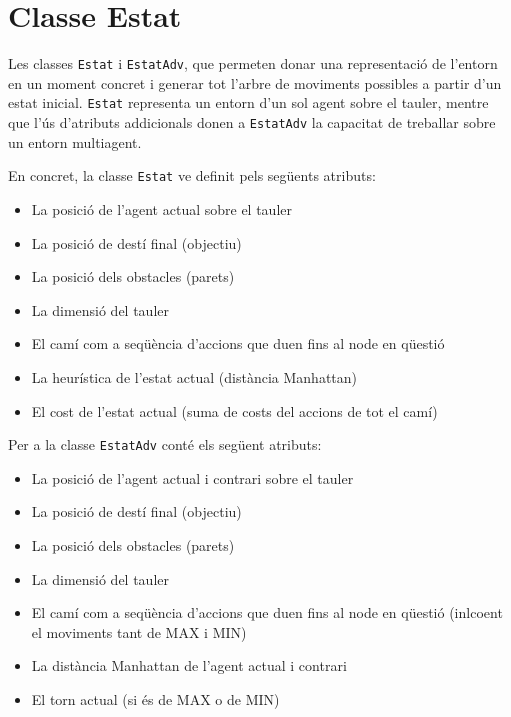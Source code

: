 \documentclass[12pt,a4paper]{report}
\begin{document}
\section{Classe Estat}
Les classes \texttt{Estat} i \texttt{EstatAdv}, que permeten donar
una representació de l'entorn en un moment concret i generar tot l'arbre de moviments possibles a partir d'un estat inicial.
\texttt{Estat} representa un entorn d'un sol agent sobre el tauler, mentre que l'ús d'atributs addicionals donen a \texttt{EstatAdv} la capacitat de treballar sobre un entorn multiagent.

\pagebreak

\vspace*{1em}
En concret, la classe \texttt{Estat} ve definit pels següents atributs:
\begin{itemize}[topsep=0pt, partopsep=0pt, parsep=0pt, itemsep=4pt]
    \item La posició de l'agent actual sobre el tauler
    \item La posició de destí final (objectiu)
    \item La posició dels obstacles (parets)
    \item La dimensió del tauler
    \item El camí com a seqüència d'accions que duen fins al node en qüestió
    \item La heurística de l'estat actual (distància Manhattan)
    \item El cost de l'estat actual (suma de costs del accions de tot el camí)
\end{itemize}

Per a la classe \texttt{EstatAdv} conté els següent atributs:
\begin{itemize}[topsep=0pt, partopsep=0pt, parsep=0pt, itemsep=4pt]
    \item La posició de l'agent actual i contrari sobre el tauler
    \item La posició de destí final (objectiu)
    \item La posició dels obstacles (parets)
    \item La dimensió del tauler
    \item El camí com a seqüència d'accions que duen fins al node en qüestió (inlcoent el moviments tant de MAX i MIN)
    \item La distància Manhattan de l'agent actual i contrari
    \item El torn actual (si és de MAX o de MIN)
\end{itemize}
\end{document}
